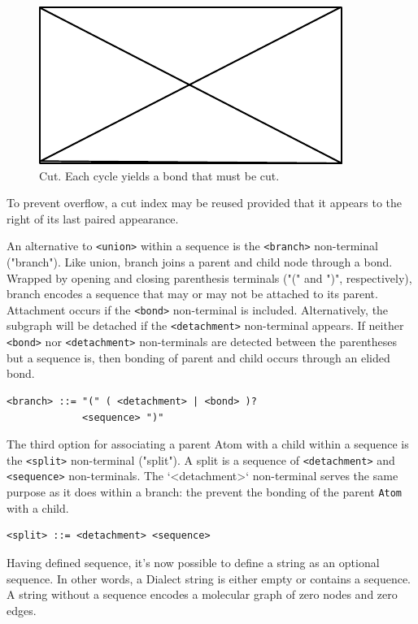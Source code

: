 \documentclass{article}
\def\ttt{\texttt}
\begin{document}
\begin{figure}
    \centering
    \includegraphics{filler}
    \caption{Cut. Each cycle yields a bond that must be cut.}
    \label{fig:cut}
\end{figure}

To prevent overflow, a cut index may be reused provided that it appears to the right of its last paired appearance.

An alternative to \ttt{<union>} within a sequence is the \ttt{<branch>} non-terminal ("branch"). Like union, branch joins a parent and child node through a bond. Wrapped by opening and closing parenthesis terminals ("(" and ")", respectively), branch encodes a sequence that may or may not be attached to its parent. Attachment occurs if the \ttt{<bond>} non-terminal is included. Alternatively, the subgraph will be detached if the \ttt{<detachment>} non-terminal appears. If neither \ttt{<bond>} nor \ttt{<detachment>} non-terminals are detected between the parentheses but a sequence is, then bonding of parent and child occurs through an elided bond.

\begin{lstlisting}
<branch> ::= "(" ( <detachment> | <bond> )?
             <sequence> ")"
\end{lstlisting}

The third option for associating a parent Atom with a child within a sequence is the \ttt{<split>} non-terminal ("split"). A split is a sequence of \ttt{<detachment>} and \ttt{<sequence>} non-terminals. The `<detachment>` non-terminal serves the same purpose as it does within a branch: the prevent the bonding of the parent \ttt{Atom} with a child.

\begin{lstlisting}
<split> ::= <detachment> <sequence>
\end{lstlisting}

Having defined sequence, it's now possible to define a string as an optional sequence. In other words, a Dialect string is either empty or contains a sequence. A string without a sequence encodes a molecular graph of zero nodes and zero edges.
\end{document}
